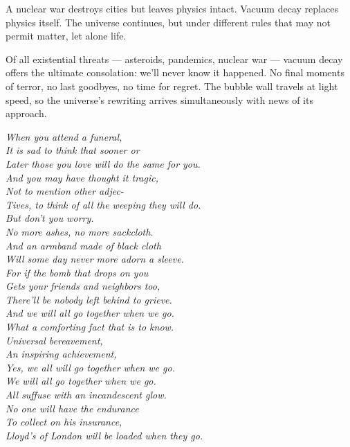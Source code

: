 A nuclear war destroys cities but leaves physics intact. Vacuum decay replaces physics itself. The universe continues, but under different rules that may not permit matter, let alone life.

\newpage

\begin{commentary}
Of all existential threats — asteroids, pandemics, nuclear war — vacuum decay offers the ultimate consolation: we'll never know it happened. No final moments of terror, no last goodbyes, no time for regret. The bubble wall travels at light speed, so the universe's rewriting arrives simultaneously with news of its approach.

\begin{multicols}{2}
\small\itshape
When you attend a funeral,\\
It is sad to think that sooner or\\
Later those you love will do the same for you.\\
And you may have thought it tragic,\\
Not to mention other adjec-\\
Tives, to think of all the weeping they will do.\\
But don't you worry.\\
No more ashes, no more sackcloth.\\
And an armband made of black cloth\\
Will some day never more adorn a sleeve.\\
For if the bomb that drops on you\\
Gets your friends and neighbors too,\\
There'll be nobody left behind to grieve.\\[0.5em]
And we will all go together when we go.\\
What a comforting fact that is to know.\\
Universal bereavement,\\
An inspiring achievement,\\
Yes, we all will go together when we go.\\[0.5em]
We will all go together when we go.\\
All suffuse with an incandescent glow.\\
No one will have the endurance\\
To collect on his insurance,\\
Lloyd's of London will be loaded when they go.\\[0.5em]

\end{multicols}
\end{commentary}
